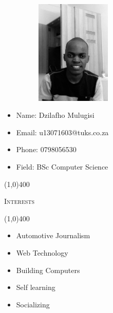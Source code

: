 \documentclass[12pt,a4paper]{report}
\begin{document}
\newpage
\vspace*{-3cm}\
\begin{minipage}{0.5\textwidth}
\begin{figure}[H]
\includegraphics[width=5cm,height=5cm,keepaspectratio]{u13071603.jpg}
\end{figure}
\end{minipage} \hfill
\begin{minipage}{0.6\textwidth}
\begin{itemize}
\item[] Name: Dzilafho Mulugisi
\item[] Email: u13071603@tuks.co.za
\item[] Phone: 0798056530
\item[] Field: BSc Computer Science
\end{itemize}
\end{minipage}

\begin{center}
	
	\line(1,0){400}\\
	{\scshape\large Interests\par}
	\line(1,0){400}\\
	\end{center}
	\begin{itemize}
\item Automotive Journalism
\item Web Technology
\item Building Computers
\item Self learning
\item Socializing
\end{itemize}
	
\end{document}
